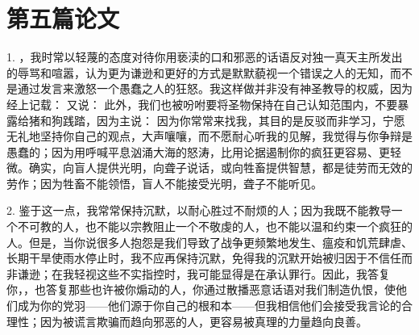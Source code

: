 

\section{第五篇论文}

\par

\par

1. ，我时常以轻蔑的态度对待你用亵渎的口和邪恶的话语反对独一真天主所发出的辱骂和喧嚣，认为更为谦逊和更好的方式是默默藐视一个错误之人的无知，而不是通过发言来激怒一个愚蠢之人的狂怒。我这样做并非没有神圣教导的权威，因为经上记载： 又说： 此外，我们也被吩咐要将圣物保持在自己认知范围内，不要暴露给猪和狗践踏，因为主说： 因为你常常来找我，其目的是反驳而非学习，宁愿无礼地坚持你自己的观点，大声嚷嚷，而不愿耐心听我的见解，我觉得与你争辩是愚蠢的；因为用呼喊平息汹涌大海的怒涛，比用论据遏制你的疯狂更容易、更轻微。确实，向盲人提供光明，向聋子说话，或向牲畜提供智慧，都是徒劳而无效的劳作；因为牲畜不能领悟，盲人不能接受光明，聋子不能听见。\par

2. 鉴于这一点，我常常保持沉默，以耐心胜过不耐烦的人；因为我既不能教导一个不可教的人，也不能以宗教阻止一个不敬虔的人，也不能以温和约束一个疯狂的人。但是，当你说很多人抱怨是我们导致了战争更频繁地发生、瘟疫和饥荒肆虐、长期干旱使雨水停止时，我不应再保持沉默，免得我的沉默开始被归因于不信任而非谦逊；在我轻视这些不实指控时，我可能显得是在承认罪行。因此，我答复你，，也答复那些也许被你煽动的人，你通过散播恶意话语对我们制造仇恨，使他们成为你的党羽——他们源于你自己的根和本——但我相信他们会接受我言论的合理性；因为被谎言欺骗而趋向邪恶的人，更容易被真理的力量趋向良善。\par

